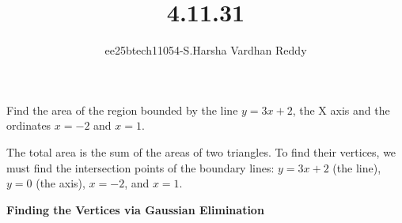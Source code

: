 \documentclass[journal]{IEEEtran}
\begin{document}

\vspace{3cm}
\title{4.11.31}
\author{ee25btech11054-S.Harsha Vardhan Reddy}
\maketitle
{\let\newpage\relax\maketitle}
\renewcommand{\thefigure}{\theenumi}
\renewcommand{\thetable}{\theenumi}
\setlength{\intextsep}{10pt} %
\renewcommand{\thetable}{\theenumi}
\begin{problem}[4.11.31]
Find the area of the region bounded by the line $y = 3x + 2$, the X axis and the ordinates $x = -2$ and $x = 1$.
\end{problem}

\solution
The total area is the sum of the areas of two triangles. To find their vertices, we must find the intersection points of the boundary lines: $y = 3x + 2$ (the line), $y = 0$ (the axis), $x = -2$, and $x = 1$.

\noindent\textbf{Finding the Vertices via Gaussian Elimination}
\end{document}

